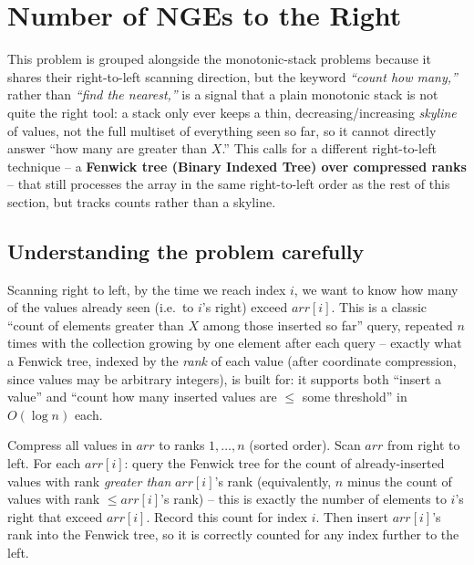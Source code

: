 \section{Number of NGEs to the Right}
\label{sec:sq-num-nges}


\begin{patternbox}
This problem is grouped alongside the monotonic-stack problems because it
shares their right-to-left scanning direction, but the keyword
\emph{``count how many,''} rather than \emph{``find the nearest,''} is a
signal that a plain monotonic stack is not quite the right tool: a stack
only ever keeps a thin, decreasing/increasing \emph{skyline} of values, not
the full multiset of everything seen so far, so it cannot directly answer
``how many are greater than $X$.'' This calls for a different right-to-left
technique -- a \textbf{Fenwick tree (Binary Indexed Tree) over compressed
ranks} -- that still processes the array in the same right-to-left order
as the rest of this section, but tracks counts rather than a skyline.
\end{patternbox}

\subsection*{Understanding the problem carefully}

Scanning right to left, by the time we reach index $i$, we want to know
how many of the values already seen (i.e.\ to $i$'s right) exceed
$\textit{arr}[i]$. This is a classic ``count of elements greater than $X$
among those inserted so far'' query, repeated $n$ times with the
collection growing by one element after each query -- exactly what a
Fenwick tree, indexed by the \emph{rank} of each value (after coordinate
compression, since values may be arbitrary integers), is built for: it
supports both ``insert a value'' and ``count how many inserted values are
$\le$ some threshold'' in $O(\log n)$ each.

\begin{ideabox}
Compress all values in $\textit{arr}$ to ranks $1, \dots, n$ (sorted
order). Scan $\textit{arr}$ from right to left. For each $\textit{arr}[i]$:
query the Fenwick tree for the count of already-inserted values with rank
\emph{greater than} $\textit{arr}[i]$'s rank (equivalently, $n$ minus the
count of values with rank $\le \textit{arr}[i]$'s rank) -- this is exactly
the number of elements to $i$'s right that exceed $\textit{arr}[i]$.
Record this count for index $i$. Then insert $\textit{arr}[i]$'s rank into
the Fenwick tree, so it is correctly counted for any index further to the
left.
\end{ideabox}

